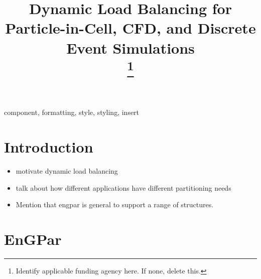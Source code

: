 \documentclass[conference]{IEEEtran}
\begin{document}
\title{Dynamic Load Balancing for Particle-in-Cell, CFD, and Discrete Event Simulations\\
\thanks{Identify applicable funding agency here. If none, delete this.}
}

\author{
\and
{}
\and
{}
}

\maketitle

\begin{abstract}

\end{abstract}

\begin{IEEEkeywords}
component, formatting, style, styling, insert
\end{IEEEkeywords}

\section{Introduction}

\begin{itemize}
\item motivate dynamic load balancing
\item talk about how different applications have different partitioning needs
\item Mention that engpar is general to support a range of structures.
\end{itemize}

\section{EnGPar}
\end{document}
